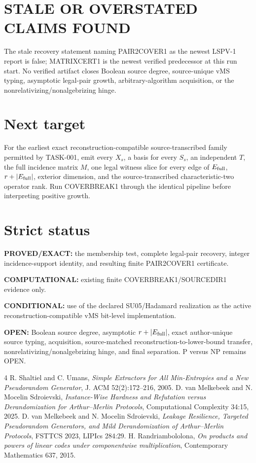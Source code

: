 \documentclass[11pt]{article}
\begin{document}
\section*{STALE OR OVERSTATED CLAIMS FOUND}
The stale recovery statement naming PAIR2COVER1 as the newest LSPV-1 report is false; MATRIXCERT1 is the newest verified predecessor at this run start. No verified artifact closes Boolean source degree, source-unique vMS typing, asymptotic legal-pair growth, arbitrary-algorithm acquisition, or the nonrelativizing/nonalgebrizing hinge.

\section*{Next target}
For the earliest exact reconstruction-compatible source-transcribed family permitted by TASK-001, emit every \(X_s\), a basis for every \(S_s\), an independent \(T\), the full incidence matrix \(M\), one legal witness slice for every edge of \(E_{\rm full}\), \(r+|E_{\rm full}|\), exterior dimension, and the source-transcribed characteristic-two operator rank. Run COVERBREAK1 through the identical pipeline before interpreting positive growth.

\section*{Strict status}
\textbf{PROVED/EXACT:} the membership test, complete legal-pair recovery, integer incidence-support identity, and resulting finite PAIR2COVER1 certificate.

\textbf{COMPUTATIONAL:} existing finite COVERBREAK1/SOURCEDIR1 evidence only.

\textbf{CONDITIONAL:} use of the declared SU05/Hadamard realization as the active reconstruction-compatible vMS bit-level implementation.

\textbf{OPEN:} Boolean source degree, asymptotic \(r+|E_{\rm full}|\), exact author-unique source typing, acquisition, source-matched reconstruction-to-lower-bound transfer, nonrelativizing/nonalgebrizing hinge, and final separation. P versus NP remains OPEN.

\begin{thebibliography}{4}
 R. Shaltiel and C. Umans, \emph{Simple Extractors for All Min-Entropies and a New Pseudorandom Generator}, J. ACM 52(2):172--216, 2005.
 D. van Melkebeek and N. Mocelin Sdroievski, \emph{Instance-Wise Hardness and Refutation versus Derandomization for Arthur--Merlin Protocols}, Computational Complexity 34:15, 2025.
 D. van Melkebeek and N. Mocelin Sdroievski, \emph{Leakage Resilience, Targeted Pseudorandom Generators, and Mild Derandomization of Arthur--Merlin Protocols}, FSTTCS 2023, LIPIcs 284:29.
 H. Randriambololona, \emph{On products and powers of linear codes under componentwise multiplication}, Contemporary Mathematics 637, 2015.
\end{thebibliography}
\end{document}
